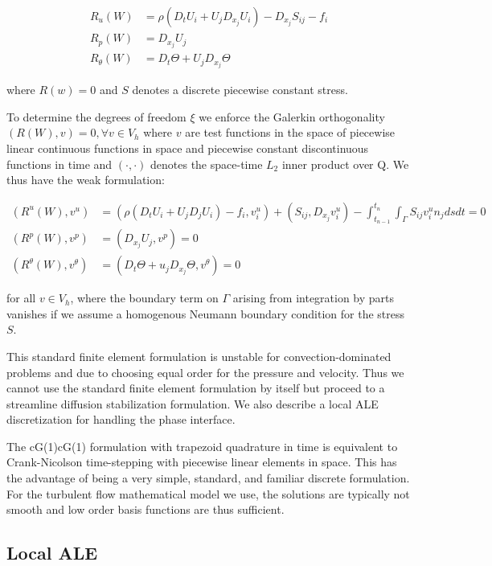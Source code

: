 \begin{align}
  R_u(W) &= \rho(D_t U_i + U_j D_{x_j} U_i) - D_{x_j} S_{ij} - f_i\\
  R_p(W) &= D_{x_j} U_j\\
  R_\theta(W) &= D_t \Theta + U_j D_{x_j} \Theta
\end{align}

where $R(w) = 0$ and $S$ denotes a discrete piecewise constant
stress. 

To determine the degrees of freedom $\xi$ we enforce the Galerkin
orthogonality $(R(W), v) = 0, \forall v \in V_h$ where $v$ are test
functions in the space of piecewise linear continuous functions in
space and piecewise constant discontinuous functions in time and
$(\cdot,\cdot)$ denotes the space-time $L_2$ inner product over Q. We
thus have the weak formulation:

\begin{align}
  (R^u(W), v^u) &= (\rho(D_t U_i + U_j D_j U_i) - f_i, v^u_i) + (S_{ij}, D_{x_j} v^u_i) - \int_{t_{n-1}}^{t_n}\int_\Gamma S_{ij} v^u_i n_j ds dt = 0\\
  (R^p(W), v^p) &= (D_{x_j} U_j, v^p) = 0\\
  (R^\theta(W), v^\theta) &= (D_t \Theta + u_j D_{x_j} \Theta, v^\theta) = 0
\end{align}

for all $v \in V_h$, where the boundary term on $\Gamma$ arising from
integration by parts vanishes if we assume a homogenous Neumann
boundary condition for the stress $S$.

This standard finite element formulation is unstable for
convection-dominated problems and due to choosing equal order for the
pressure and velocity. Thus we cannot use the standard finite element
formulation by itself but proceed to a streamline diffusion
stabilization formulation. We also describe a local ALE discretization
for handling the phase interface.

The cG(1)cG(1) formulation with trapezoid quadrature in time is
equivalent to Crank-Nicolson time-stepping with piecewise linear
elements in space. This has the advantage of being a very simple,
standard, and familiar discrete formulation. For the turbulent flow
mathematical model we use, the solutions are typically not smooth and
low order basis functions are thus sufficient.

\subsection{Local ALE}

